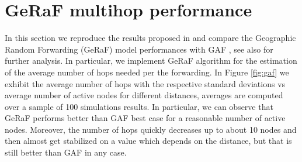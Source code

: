 \documentclass[twoside,onecolumn]{article}
\theoremstyle{definition}
\begin{document}
\section{GeRaF multihop performance}
In this section we reproduce the results proposed in \cite{zorzi2}  and compare the Geographic Random Forwarding (GeRaF) model performances with GAF \cite{gaf}, see also \cite{zorzi1} for further analysis.
In particular, we implement GeRaF algorithm for the estimation of the average number of hops needed per the forwarding. In Figure \ref{fig:gaf} we exhibit the average number of hops  with the respective standard deviations vs average number of active nodes for different distances, averages are computed over a sample of 100 simulations results. In particular, we can observe that GeRaF performs better than GAF best case for a reasonable number of active nodes. Moreover, the number of hops quickly decreases up to about 10 nodes and then almost get stabilized on a value which depends on the distance, but that is still better than GAF in any case.
\end{document}
